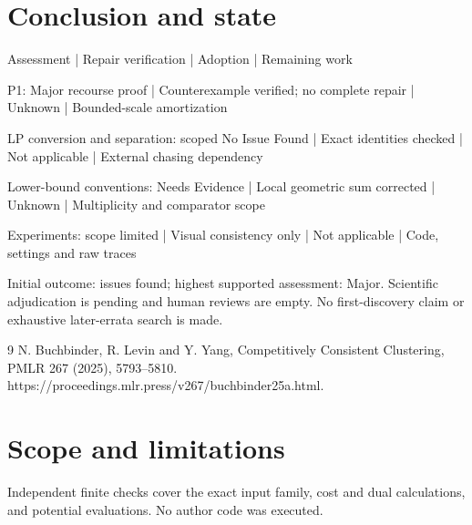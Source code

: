 \documentclass[10pt]{article}
\begin{document}
\section*{Conclusion and state}
Assessment | Repair verification | Adoption | Remaining work\par
P1: Major recourse proof | Counterexample verified; no complete repair | Unknown | Bounded-scale amortization\par
LP conversion and separation: scoped No Issue Found | Exact identities checked | Not applicable | External chasing dependency\par
Lower-bound conventions: Needs Evidence | Local geometric sum corrected | Unknown | Multiplicity and comparator scope\par
Experiments: scope limited | Visual consistency only | Not applicable | Code, settings and raw traces\par
Initial outcome: issues found; highest supported assessment: Major. Scientific adjudication is pending and human reviews are empty. No first-discovery claim or exhaustive later-errata search is made.\par
9 N. Buchbinder, R. Levin and Y. Yang, Competitively Consistent Clustering, PMLR 267 (2025), 5793–5810. https://proceedings.mlr.press/v267/buchbinder25a.html.\par
\section*{Scope and limitations}
Independent finite checks cover the exact input family, cost and dual calculations, and potential evaluations. No author code was executed.\par
\end{document}
